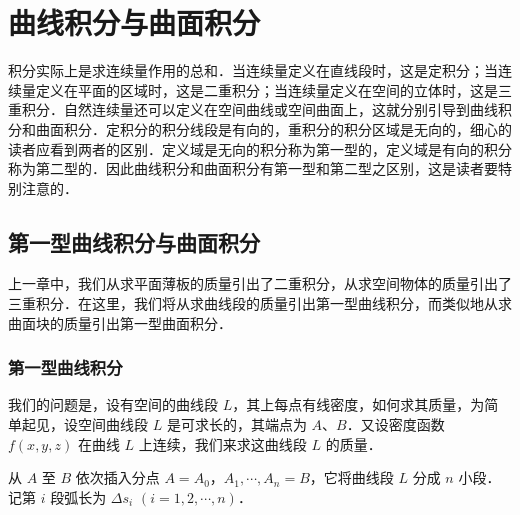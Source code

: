 \chapter{曲线积分与曲面积分}

积分实际上是求连续量作用的总和．当连续量定义在直线段时，这是定积分；当连续量定义在平面的区域时，这是二重积分；当连续量定义在空间的立体时，这是三重积分．自然连续量还可以定义在空间曲线或空间曲面上，这就分别引导到曲线积分和曲面积分．定积分的积分线段是有向的，重积分的积分区域是无向的，细心的读者应看到两者的区别．定义域是无向的积分称为第一型的，定义域是有向的积分称为第二型的．因此曲线积分和曲面积分有第一型和第二型之区别，这是读者要特别注意的．

\section{第一型曲线积分与曲面积分}

上一章中，我们从求平面薄板的质量引出了二重积分，从求空间物体的质量引出了三重积分．在这里，我们将从求曲线段的质量引出第一型曲线积分，而类似地从求曲面块的质量引出第一型曲面积分．

\subsection{第一型曲线积分}

我们的问题是，设有空间的曲线段 $L$，其上每点有线密度，如何求其质量，为简单起见，设空间曲线段 $L$ 是可求长的，其端点为 $A$、$B$．又设密度函数 $f(x,y,z)$ 在曲线 $L$ 上连续，我们来求这曲线段 $L$ 的质量．

从 $A$ 至 $B$ 依次插入分点 $A=A_{0}$，$A_{1},\cdots,A_{n}=B$，它将曲线段 $L$ 分成 $n$ 小段．记第 $i$ 段弧长为 $\Delta s_{i}$ $(i=1,2,\cdots,n)$．

\begin{figure}[htbp]
\centering
{}\caption{\relax}\label{fig:21-1}
\end{figure}

